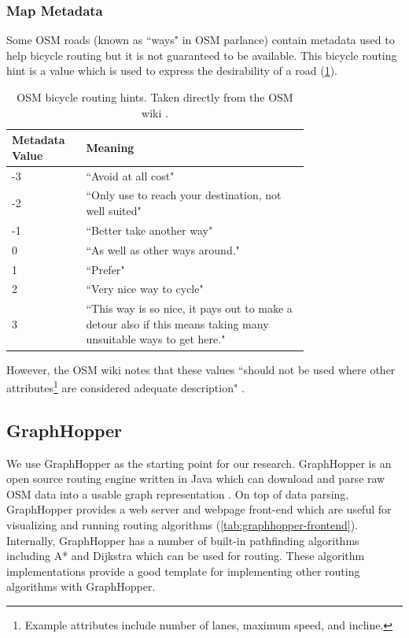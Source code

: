 \documentclass[honors]{union-cs-thesis}
\begin{document}
\subsubsection{Map Metadata}
Some OSM roads (known as ``ways" in OSM parlance) contain metadata used to help bicycle routing but it is not guaranteed to be available. This bicycle routing hint is a value which is used to express the desirability of a road (\cref{tab:osm-hint}).  
\begin{table}
\begin{center}
    \begin{tabular}{|l|p{0.75\linewidth}|}
        \hline
        \textbf{Metadata Value} & \textbf{Meaning} \\
        \hline
        -3 & ``Avoid at all cost" \\
        \hline
        -2 & ``Only use to reach your destination, not well suited" \\
        \hline
        -1 & ``Better take another way" \\
        \hline
        0 & ``As well as other ways around." \\
        \hline
        1 & ``Prefer" \\
        \hline
        2 & ``Very nice way to cycle" \\
        \hline
        3 & ``This way is so nice, it pays out to make a detour also if this means taking many unsuitable ways to get here." \\
        \hline
    \end{tabular}
\end{center}
\caption[Bicycle routing hints]{OSM bicycle routing hints. Taken directly from the OSM wiki \cite{osm}.}
\label{tab:osm-hint}
\end{table}
However, the OSM wiki notes that these values ``should not be used where other attributes\footnote{Example attributes include number of lanes, maximum speed, and incline.} are considered adequate description" \cite{osm}.

\subsection{GraphHopper}
\label{sec:graphhopper}
We use GraphHopper as the starting point for our research. GraphHopper is an open source routing engine written in Java which can download and parse raw OSM data into a usable graph representation \cite{graphhopper}. On top of data parsing, GraphHopper provides a web server and webpage front-end which are useful for visualizing and running routing algorithms (\cref{tab:graphhopper-frontend}). Internally, GraphHopper has a number of built-in pathfinding algorithms including A* and Dijkstra which can be used for routing. These algorithm implementations provide a good template for implementing other routing algorithms with GraphHopper. 
\end{document}
